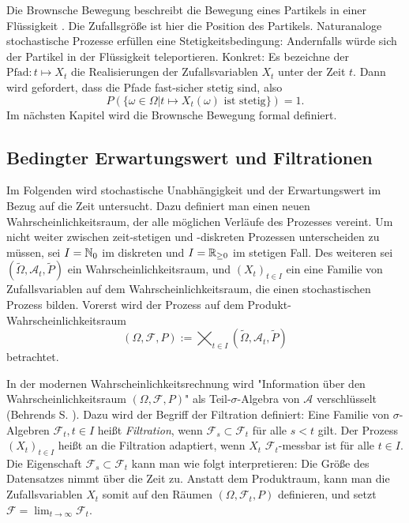 \begin{bsp}
Die Brownsche Bewegung beschreibt die Bewegung eines Partikels in 
einer Flüssigkeit \cite{webster_bb}. Die Zufallsgröße ist hier die Position des Partikels.
Naturanaloge stochastische Prozesse erfüllen eine Stetigkeitsbedingung: 
Andernfalls würde sich der Partikel in der Flüssigkeit teleportieren. 
Konkret: Es bezeichne der $\text{Pfad}: t \mapsto X_t$ die Realisierungen der Zufallsvariablen $X_t$ unter 
der Zeit $t$. Dann wird gefordert, dass die Pfade fast-sicher stetig sind, also 
$$P(\{\omega \in \Omega | t \mapsto X_t(\omega) \text{ ist stetig}\}) = 1.$$ 
Im nächsten Kapitel wird die Brownsche Bewegung formal definiert.
\end{bsp}

\subsection{Bedingter Erwartungswert und Filtrationen}

Im Folgenden wird stochastische Unabhängigkeit und der Erwartungswert im Bezug auf die Zeit untersucht. 
Dazu definiert man einen neuen Wahrscheinlichkeitsraum, 
der alle möglichen Verläufe des Prozesses vereint. 
Um nicht weiter zwischen zeit-stetigen und -diskreten Prozessen unterscheiden zu müssen, 
sei $I = \Bbb N_0$ im diskreten und $I = \Bbb R_{\ge 0}$ im stetigen Fall. 
Des weiteren sei $(\tilde \Omega, \mathcal A_t, \tilde P)$ ein Wahrscheinlichkeitsraum, 
und $(X_t)_{t \in I}$ ein eine Familie von Zufallsvariablen auf dem Wahrscheinlichkeitsraum, 
die einen stochastischen Prozess bilden. Vorerst wird der Prozess 
auf dem Produkt-Wahrscheinlichkeitsraum
$$(\Omega, \mathcal F, P) := \bigtimes_{t \in I}(\tilde \Omega, \mathcal A_t,\tilde P)$$
betrachtet.

\begin{defi}[Adaptiertheit]
In der modernen Wahrscheinlichkeitsrechnung wird "Information über den
Wahrscheinlichkeitsraum $(\Omega, \mathcal F, P)$" als Teil-$\sigma$-Algebra 
von $\mathcal A$ verschlüsselt (Behrends \cite{behrends} S. ). Dazu wird der Begriff der Filtration 
definiert: Eine Familie von $\sigma$-Algebren $\mathcal F_t, t \in I$ heißt \textit{Filtration}, 
wenn $\mathcal F_s \subset \mathcal F_t$ für alle $s \lt t$ gilt. 
Der Prozess $(X_t)_{t \in I}$ heißt an die Filtration adaptiert, 
wenn $X_t$ $\mathcal F_t$-messbar ist für alle $t \in I$. Die Eigenschaft 
$\mathcal F_s \subset \mathcal F_t$ kann man wie folgt interpretieren: 
Die Größe des Datensatzes nimmt über die Zeit zu. Anstatt dem Produktraum, kann man 
die Zufallsvariablen $X_t$ somit auf den Räumen $(\Omega, \mathcal F_t, P)$ definieren, 
und setzt $\mathcal F = \lim_{t \to \infty} \mathcal F_t$.

\end{defi}

